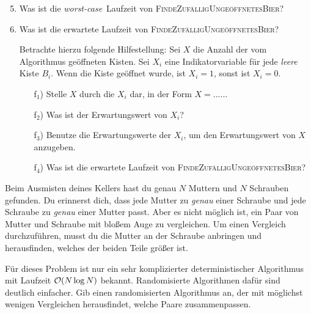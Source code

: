 \documentclass{uebung_cs}
\begin{document}
\begin{exercise}[Bierkisten][\href{https://moodle.studiumdigitale.uni-frankfurt.de/moodle/mod/assign/view.php?id=239340}{moodle}\athome]
	\begin{enumerate}
		\setcounter{enumi}{4}
		\item\easy Was ist die \textit{worst-case}~Laufzeit von \textsc{FindeZufälligUngeöffnetesBier}?
		\item\hard Was ist die erwartete Laufzeit von \textsc{FindeZufälligUngeöffnetesBier}?
		\item[] Betrachte hierzu folgende Hilfestellung: Sei $X$ die Anzahl der vom Algorithmus geöffneten Kisten. Sei $X_i$ eine Indikatorvariable für jede \emph{leere} Kiste $B_i$. Wenn die Kiste geöffnet wurde, ist $X_i = 1$, sonst ist $X_i = 0$. 
		\begin{itemize}[topsep=0.21cm, leftmargin=1.2cm]
			\item[f$_1$)] Stelle $X$ durch die $X_i$ dar, in der Form $X = .....$.
			\item[f$_2$)] Was ist der Erwartungswert von $X_i$?
			\item[f$_3$)] Benutze die Erwartungswerte der $X_i$, um den Erwartungswert von $X$ anzugeben.
			\item[f$_4$)] Was ist die erwartete Laufzeit von \textsc{FindeZufälligUngeöffnetesBier}?
		\end{itemize}
	\end{enumerate}
\end{exercise}


\begin{exercise}[Schrauben und Muttern][\atschool\hard]
	Beim Ausmisten deines Kellers hast du genau $N$ Muttern und $N$ Schrauben gefunden.
	Du erinnerst dich, dass jede Mutter zu \emph{genau} einer Schraube und jede Schraube zu \emph{genau} einer Mutter passt.
	Aber es nicht möglich ist, ein Paar von Mutter und Schraube mit bloßem Auge zu vergleichen. 
	Um einen Vergleich durchzuführen, musst du die Mutter an der Schraube anbringen und herausfinden, welches der beiden Teile größer ist. 

	Für dieses Problem ist nur ein sehr komplizierter deterministischer Algorithmus mit Laufzeit $\mathcal{O}(N \log N)$ bekannt.
	Randomisierte Algorithmen dafür sind deutlich einfacher.
	Gib einen randomisierten Algorithmus an, der mit möglichst wenigen Vergleichen herausfindet, welche Paare zusammenpassen. 
	
\end{exercise}

\clearpage
\end{document}
